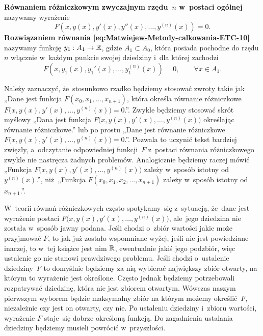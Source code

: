 \documentclass[a4paper,11pt]{article}
\numberwithin{equation}{section}
\begin{document}
\textbf{Równaniem różniczkowym zwyczajnym rzędu~$n$ w~postaci ogólnej}
nazywamy wyrażenie
\begin{equation}
  \label{eq:Czym-jest-rownanie-ETC-03}
  F\left( x, y( x ), y'( x ), y''( x ), \ldots, y^{ ( n ) }( x ) \right) = 0.
\end{equation}
\textbf{Rozwiązaniem równania \eqref{eq:Matwiejew-Metody-calkowania-ETC-10}}
nazywamy funkcję $y_{ 1 } : A_{ 1 } \to \mathbb{R}$, gdzie $A_{ 1 } \subset A_{ 0 }$, która
posiada pochodne do rzędu $n$ włącznie w~każdym punkcie swojej dziedziny
i~dla której zachodzi
\begin{equation}
  \label{eq:Czym-jest-rownanie-ETC-04}
  F\left( x, y_{ 1 }( x ), y_{ 1 }'( x ), \ldots, y_{ 1 }^{ ( n ) }( x ) \right) =
  0, \qquad
  \forall x \in A_{ 1 }.
\end{equation}

Należy zaznaczyć, że~stosunkowo rzadko będziemy stosować zwroty takie jak
„Dane jest funkcja $F( x_{ 0 }, x_{ 1 }, \ldots, x_{ n + 1 } )$, która określa
równanie różniczkowe
$F\big( x, y( x ), y'( x ), \ldots, y^{ ( n ) }( x ) \big) = 0$.”. Zwykle będziemy
stosować skrót myślowy „Dana jest funkcja
$F\big( x, y( x ), y'( x ), \ldots, y^{ ( n ) }( x ) \big)$ określając równanie
różniczkowe.” lub po prostu „Dane jest równanie różniczkowe
$F\big( x, y( x ), y'( x ), \ldots, y^{ ( n ) }( x ) \big) = 0$.”. Pozwala
to uczynić tekst bardziej zwięzły, a~odczytanie odpowiedniej funkcji~$F$
z~postaci równania różniczkowego zwykle nie nastręcza żadnych problemów.
Analogicznie będziemy raczej mówić „Funkcja
$F\big( x, y( x ), y'( x ), \ldots, y^{ ( n ) }( x ) \big)$ zależy w~sposób
istotny od $y^{ ( n ) }( x )$.”, niż~„Funkcja
$F( x_{ 0 }, x_{ 1 }, x_{ 2 }, \ldots, x_{ n + 1 } )$ zależy w~sposób istotny
od~$x_{ n + 1 }$.”.

W~teorii równań różniczkowych często spotykamy~się z~sytuacją, że~dane jest
wyrażenie postaci $F\big( x, y( x ), y'( x ), \ldots, y^{ ( n ) }( x ) \big)$,
ale~jego dziedzina nie została w~sposób jawny podana. Jeśli chodzi o~zbiór
wartości jakie może przyjmować $F$, to jak już zostało wspomniane wyżej,
jeśli nie jest powiedziane inaczej, to w~tej książce jest nim $\mathbb{R}$,
ewentualnie jakiś jego podzbiór, więc ustalenie go nie stanowi prawdziwego
problemu. Jeśli chodzi o~ustalenie dziedziny~$F$ to domyślnie będziemy za
nią wybierać największy zbiór otwarty, na którym to wyrażenie jest
określone. Często jednak będziemy potrzebowali rozpatrywać dziedzinę, która
nie jest zbiorem otwartym. Wówczas naszym pierwszym wyborem będzie
maksymalny zbiór na którym możemy określić~$F$, niezależnie czy jest on
otwarty, czy nie. Po ustaleniu dziedziny i~zbioru wartości, wyrażenie $F$
staje~się dobrze określoną funkcją. Do zagadnienia ustalania dziedziny
będziemy musieli powrócić w~przyszłości.
\end{document}
